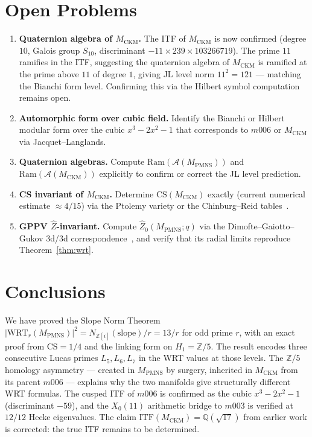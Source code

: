 \documentclass[11pt,a4paper]{article}
\theoremstyle{definition}
\theoremstyle{remark}
\newcommand{\MPMNS}{M_{\mathrm{PMNS}}}
\newcommand{\MCKM}{M_{\mathrm{CKM}}}
\newcommand{\QQ}{\mathbb{Q}}
\newcommand{\Zfive}{\mathbb{Z}/5}
\newcommand{\Zi}{\mathbb{Z}[i]}
\newcommand{\CS}{\mathrm{CS}}
\newcommand{\WRT}{\mathrm{WRT}}
\newcommand{\ITF}{\mathrm{ITF}}
\begin{document}
\section{Open Problems}
\label{sec:open}

\begin{enumerate}
\item \textbf{Quaternion algebra of $\MCKM$.}
  The ITF of $\MCKM$ is now confirmed (degree $10$, Galois group $S_{10}$,
  discriminant $-11\times239\times103266719$).
  The prime $11$ ramifies in the ITF, suggesting the quaternion algebra
  of $\MCKM$ is ramified at the prime above $11$ of degree $1$,
  giving JL level norm $11^2 = 121$ — matching the Bianchi form level.
  Confirming this via the Hilbert symbol computation remains open.

\item \textbf{Automorphic form over cubic field.}
  Identify the Bianchi or Hilbert modular form over the cubic
  $x^3-2x^2-1$ that corresponds to $m006$ or $\MCKM$ via
  Jacquet--Langlands.

\item \textbf{Quaternion algebras.}
  Compute $\mathrm{Ram}(\mathcal{A}(\MPMNS))$ and
  $\mathrm{Ram}(\mathcal{A}(\MCKM))$ explicitly to confirm or
  correct the JL level prediction.

\item \textbf{CS invariant of $\MCKM$.}
  Determine $\CS(\MCKM)$ exactly (current numerical estimate
  $\approx 4/15$) via the Ptolemy variety or the
  Chinburg--Reid tables~\cite{Chinburg01}.

\item \textbf{GPPV $\hat{Z}$-invariant.}
  Compute $\hat{Z}_0(\MPMNS;q)$ via the Dimofte--Gaiotto--Gukov
  3d/3d correspondence~\cite{DGG14}, and verify that its radial
  limits reproduce Theorem~\ref{thm:wrt}.
\end{enumerate}

\section{Conclusions}
\label{sec:concl}

We have proved the Slope Norm Theorem
$|\WRT_r(\MPMNS)|^2 = N_{\Zi}(\mathrm{slope})/r = 13/r$
for odd prime $r$, with an exact proof from $\CS = 1/4$ and
the linking form on $H_1 = \Zfive$.
The result encodes three consecutive Lucas primes $L_5, L_6, L_7$
in the WRT values at those levels.
The $\Zfive$ homology asymmetry — created in $\MPMNS$ by surgery,
inherited in $\MCKM$ from its parent $m006$ — explains why the
two manifolds give structurally different WRT formulas.
The cusped ITF of $m006$ is confirmed as the cubic $x^3-2x^2-1$
(discriminant $-59$), and the $X_0(11)$ arithmetic bridge to $m003$
is verified at $12/12$ Hecke eigenvalues.
The claim $\ITF(\MCKM) = \QQ(\sqrt{17})$ from earlier work is
corrected: the true ITF remains to be determined.
\end{document}
